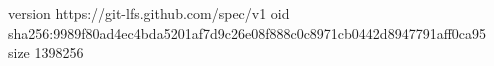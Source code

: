 version https://git-lfs.github.com/spec/v1
oid sha256:9989f80ad4ec4bda5201af7d9c26e08f888c0c8971cb0442d8947791aff0ca95
size 1398256
